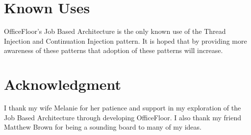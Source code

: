 \documentclass{article}
\begin{document}
\section{Known Uses}

OfficeFloor's Job Based Architecture \cite{officefloor} is the only known use of
the Thread Injection and Continuation Injection pattern.  It is hoped that by
providing more awareness of these patterns that adoption of these patterns will
increase.


\section*{Acknowledgment} I thank my wife Melanie for her patience and support
in my exploration of the Job Based Architecture through developing OfficeFloor.
I also thank my friend Matthew Brown for being a sounding board to many of my
ideas.




\end{document}
